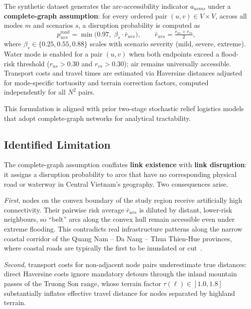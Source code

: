\documentclass{llncs}
\newcommand{\quo}[1]{``#1''}
\begin{document}
The synthetic dataset generates the arc-accessibility indicator $a_{uvms}$
under a \textbf{complete-graph assumption}: for every ordered pair
$(u,v)\in V\times V$, across all modes $m$ and scenarios $s$, a disruption
probability is computed as
%
\begin{equation}
  p^{\text{road}}_{uvs}
    = \min\!\bigl(0.97,\;\beta_s \cdot \bar{r}_{uvs}\bigr),
  \qquad
  \bar{r}_{uvs} = \tfrac{r_{us}+r_{vs}}{2},
\label{eq:p_road}
\end{equation}
%
where $\beta_s \in \{0.25, 0.55, 0.88\}$ scales with scenario severity
(mild, severe, extreme).
Water mode is enabled for a pair $(u,v)$ when both endpoints exceed a
flood-risk threshold ($r_{us} > 0.30$ and $r_{vs} > 0.30$); air remains
universally accessible.
Transport costs and travel times are estimated via Haversine distances
adjusted for mode-specific tortuosity and terrain correction factors,
computed independently for all $N^2$ pairs.

This formulation is aligned with prior two-stage stochastic relief logistics
models~\cite{barzinpour2014,tofighi2016humanitarian} that adopt complete-graph
networks for analytical tractability.

\subsection{Identified Limitation}
\label{sec:limitation}

The complete-graph assumption conflates \textbf{link existence} with
\textbf{link disruption}: it assigns a disruption probability to arcs that
have no corresponding physical road or waterway in Central Vietnam's geography.
Two consequences arise.

\textit{First}, nodes on the convex boundary of the study region receive
artificially high connectivity.
Their pairwise risk average $\bar{r}_{uvs}$ is diluted by distant,
lower-risk neighbours, so \quo{belt} arcs along the convex hull remain
accessible even under extreme flooding.
This contradicts real infrastructure patterns along the narrow coastal
corridor of the Quang Nam -- Da Nang -- Thua Thien-Hue provinces, where
coastal roads are typically the first to be inundated or cut~\cite{nguyen2021flood}.

\textit{Second}, transport costs for non-adjacent node pairs underestimate
true distances: direct Haversine costs ignore mandatory detours through the
inland mountain passes of the Truong Son range, whose terrain factor
$\tau(\ell) \in [1.0, 1.8]$ substantially inflates effective travel distance
for nodes separated by highland terrain.
\end{document}
